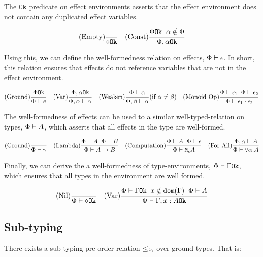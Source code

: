 \documentclass{Report}
\begin{document}
The $\texttt{Ok}$ predicate on effect environments asserts that the effect environment does not contain any duplicated effect variables.

\[
    (\text{Empty}) \frac{}{\diamond \texttt{Ok}}
\quad
    (\text{Const}) \frac{\Phi \texttt{Ok} \;\; \alpha\notin \Phi}{\Phi, \alpha \texttt{Ok}}
\]

Using this, we can define the well-formedness relation on effects, $\Phi\vdash \epsilon$. In short, this relation ensures that effects do not reference variables that are not in the effect environment.

\[
    (\text{Ground}) \frac{\Phi \texttt{Ok}}{\Phi\vdash e}
    \quad
    (\text{Var}) \frac{\Phi,\alpha \texttt{Ok}}{\Phi,\alpha\vdash \alpha}
    \quad
    (\text{Weaken}) \frac{\Phi\vdash \alpha}{\Phi,\beta\vdash \alpha}(\text{if } \alpha\neq\beta)
    \quad
    (\text{Monoid Op}) \frac{\Phi\vdash \epsilon_1\;\;\Phi\vdash \epsilon_2}{\Phi\vdash \epsilon_1\cdot\epsilon_2}
\]

The well-formedness of effects can be used to a similar well-typed-relation on types, $\Phi\vdash A$, which asserts that all effects in the type are well-formed.

\[
    (\text{Ground}) \frac{}{\Phi\vdash \gamma}
    \quad
    (\text{Lambda}) \frac{\Phi\vdash A\;\;\Phi\vdash B}{\Phi\vdash A\rightarrow B}
    \quad
    (\text{Computation}) \frac{\Phi\vdash A\;\;\Phi\vdash \epsilon}{\Phi\vdash \texttt{M}_{\epsilon}{A}}
    \quad
    (\text{For-All}) \frac{\Phi,\alpha\vdash A}{\Phi\vdash \forall \alpha. A}
\]

Finally, we can derive the a well-formedness of type-environments,   $\Phi\vdash \Gamma \texttt{Ok}$, which ensures that all types in the environment are well formed.

\[
    (\text{Nil}) \frac{}{\Phi\vdash \diamond \texttt{Ok}}
    \quad
    (\text{Var}) \frac{\Phi\vdash \Gamma \texttt{Ok}\;\; x\notin\texttt{dom}(\Gamma)\;\; \Phi\vdash A}{\Phi\vdash \Gamma, x: A \texttt{Ok}}
\]

\subsection{Sub-typing}

    There exists a sub-typing pre-order relation $\leq:_{\gamma}$ over ground types. That is:
\end{document}
